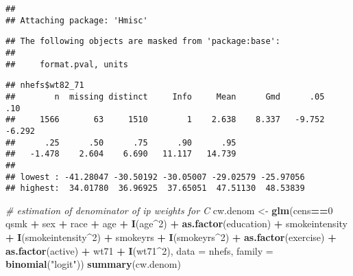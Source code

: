 \documentclass[
  10pt,
]{book}
\newenvironment{Shaded}{\begin{snugshade}}{\end{snugshade}}
\newcommand{\CommentTok}[1]{\textcolor[rgb]{0.56,0.35,0.01}{\textit{#1}}}
\newcommand{\DataTypeTok}[1]{\textcolor[rgb]{0.13,0.29,0.53}{#1}}
\newcommand{\DecValTok}[1]{\textcolor[rgb]{0.00,0.00,0.81}{#1}}
\newcommand{\KeywordTok}[1]{\textcolor[rgb]{0.13,0.29,0.53}{\textbf{#1}}}
\newcommand{\NormalTok}[1]{#1}
\newcommand{\OperatorTok}[1]{\textcolor[rgb]{0.81,0.36,0.00}{\textbf{#1}}}
\newcommand{\StringTok}[1]{\textcolor[rgb]{0.31,0.60,0.02}{#1}}
\begin{document}
\begin{verbatim}
## 
## Attaching package: 'Hmisc'
\end{verbatim}

\begin{verbatim}
## The following objects are masked from 'package:base':
## 
##     format.pval, units
\end{verbatim}

\begin{Shaded}
\end{Shaded}

\begin{verbatim}
## nhefs$wt82_71 
##        n  missing distinct     Info     Mean      Gmd      .05      .10 
##     1566       63     1510        1    2.638    8.337   -9.752   -6.292 
##      .25      .50      .75      .90      .95 
##   -1.478    2.604    6.690   11.117   14.739 
## 
## lowest : -41.28047 -30.50192 -30.05007 -29.02579 -25.97056
## highest:  34.01780  36.96925  37.65051  47.51130  48.53839
\end{verbatim}

\begin{Shaded}
\begin{Highlighting}[]
\CommentTok{# estimation of denominator of ip weights for C}
\NormalTok{cw.denom <-}\StringTok{ }\KeywordTok{glm}\NormalTok{(cens}\OperatorTok{==}\DecValTok{0} \OperatorTok{~}\StringTok{ }\NormalTok{qsmk }\OperatorTok{+}\StringTok{ }\NormalTok{sex }\OperatorTok{+}\StringTok{ }\NormalTok{race }\OperatorTok{+}\StringTok{ }\NormalTok{age }\OperatorTok{+}\StringTok{ }\KeywordTok{I}\NormalTok{(age}\OperatorTok{^}\DecValTok{2}\NormalTok{) }
                     \OperatorTok{+}\StringTok{ }\KeywordTok{as.factor}\NormalTok{(education) }\OperatorTok{+}\StringTok{ }\NormalTok{smokeintensity }\OperatorTok{+}\StringTok{ }\KeywordTok{I}\NormalTok{(smokeintensity}\OperatorTok{^}\DecValTok{2}\NormalTok{) }
                     \OperatorTok{+}\StringTok{ }\NormalTok{smokeyrs }\OperatorTok{+}\StringTok{ }\KeywordTok{I}\NormalTok{(smokeyrs}\OperatorTok{^}\DecValTok{2}\NormalTok{) }\OperatorTok{+}\StringTok{ }\KeywordTok{as.factor}\NormalTok{(exercise) }
                     \OperatorTok{+}\StringTok{ }\KeywordTok{as.factor}\NormalTok{(active) }\OperatorTok{+}\StringTok{ }\NormalTok{wt71 }\OperatorTok{+}\StringTok{ }\KeywordTok{I}\NormalTok{(wt71}\OperatorTok{^}\DecValTok{2}\NormalTok{), }
                     \DataTypeTok{data =}\NormalTok{ nhefs, }\DataTypeTok{family =} \KeywordTok{binomial}\NormalTok{(}\StringTok{"logit"}\NormalTok{))}
\KeywordTok{summary}\NormalTok{(cw.denom)}
\end{Highlighting}
\end{Shaded}
\end{document}

